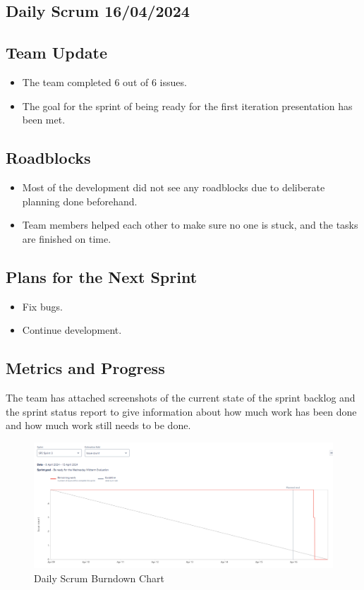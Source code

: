\documentclass[12pt]{report}
\begin{document}
\subsection*{Daily Scrum 16/04/2024}
\subsection*{Team Update}
\begin{itemize}
    \item The team completed 6 out of 6 issues.
    \item The goal for the sprint of being ready for the first iteration presentation has been met.
\end{itemize}

\subsection*{Roadblocks}
\begin{itemize}
    \item Most of the development did not see any roadblocks due to deliberate planning done beforehand.
    \item Team members helped each other to make sure no one is stuck, and the tasks are finished on time.
\end{itemize}

\subsection*{Plans for the Next Sprint}
\begin{itemize}
    \item Fix bugs.
    \item Continue development.
\end{itemize}

\subsection*{Metrics and Progress}
The team has attached screenshots of the current state of the sprint backlog and the sprint status report to give information about how much work has been done and how much work still needs to be done.

\begin{figure}[H]
  \centering
  \includegraphics[width=1\textwidth]{Resources/3-Sprint/Daily-Scrum/burndownchart_sprint3.png}
  \caption{Daily Scrum Burndown Chart}
  \label{fig:S3Scrum2-image}
\end{figure}
\end{document}
